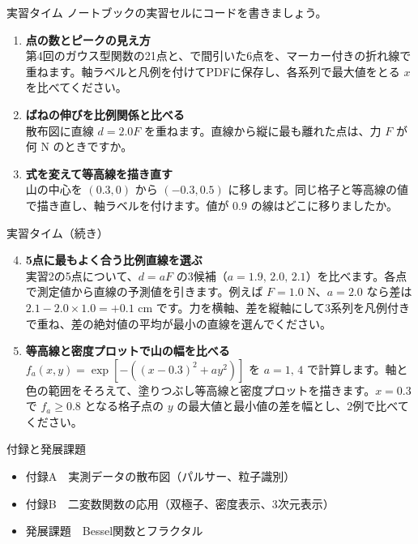 \documentclass[12pt,aspectratio=43]{beamer}
\newcommand{\code}[1]{{\codefont #1}}
\begin{document}
\begin{frame}[t]{実習タイム}
  \setlength{\parskip}{0pt}
  ノートブックの実習セルにコードを書きましょう。
  \begin{enumerate}
    \setlength{\itemsep}{2mm}
    \item \textbf{点の数とピークの見え方}\\
      {\small 第4回のガウス型関数の21点と、\code{[::4]}で間引いた6点を、マーカー付きの折れ線で重ねます。軸ラベルと凡例を付けてPDFに保存し、各系列で最大値をとる \(x\) を比べてください。}
    \item \textbf{ばねの伸びを比例関係と比べる}\\
      {\small 散布図に直線 \(d=2.0F\) を重ねます。直線から縦に最も離れた点は、力 \(F\) が何 N のときですか。}
    \item \textbf{式を変えて等高線を描き直す}\\
      {\small 山の中心を \((0.3,0)\) から \((-0.3,0.5)\) に移します。同じ格子と等高線の値で描き直し、軸ラベルを付けます。値が \(0.9\) の線はどこに移りましたか。}
  \end{enumerate}
\end{frame}

\begin{frame}[t]{実習タイム（続き）}
  \setlength{\parskip}{0pt}
  \begin{enumerate}
    \setcounter{enumi}{3}
    \setlength{\itemsep}{4mm}
    \item \textbf{5点に最もよく合う比例直線を選ぶ}\\
      {\small 実習2の5点について、\(d=aF\) の3候補（\(a=1.9,\,2.0,\,2.1\)）を比べます。各点で測定値から直線の予測値を引きます。例えば \(F=1.0\) N、\(a=2.0\) なら差は \(2.1-2.0\times1.0=+0.1\) cm です。力を横軸、差を縦軸にして3系列を凡例付きで重ね、差の絶対値の平均が最小の直線を選んでください。}
    \item \textbf{等高線と密度プロットで山の幅を比べる}\\
      {\small \(f_a(x,y)=\exp[-((x-0.3)^2+ay^2)]\) を \(a=1,\,4\) で計算します。軸と色の範囲をそろえて、塗りつぶし等高線と密度プロットを描きます。\(x=0.3\) で \(f_a\geq0.8\) となる格子点の \(y\) の最大値と最小値の差を幅とし、2例で比べてください。}
  \end{enumerate}
\end{frame}

\begin{frame}[t]{付録と発展課題}
  \begin{itemize}
    \setlength{\itemsep}{2mm}
    \item 付録A　実測データの散布図（パルサー、粒子識別）
    \item 付録B　二変数関数の応用（双極子、密度表示、3次元表示）
    \item 発展課題　Bessel関数とフラクタル
  \end{itemize}
\end{frame}
\end{document}
